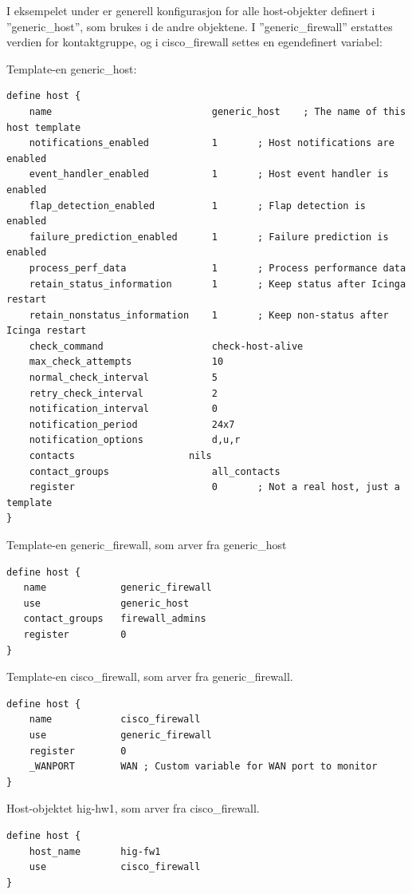 I eksempelet under er generell konfigurasjon for alle host-objekter definert i ''generic\_host'', som brukes i de andre objektene. I ''generic\_firewall'' erstattes verdien for kontaktgruppe, og i cisco\_firewall settes en egendefinert variabel:

Template-en generic\_host: 

\begin{lstlisting}[style=example]
define host {
    name                            generic_host    ; The name of this host template
    notifications_enabled           1       ; Host notifications are enabled
    event_handler_enabled           1       ; Host event handler is enabled
    flap_detection_enabled          1       ; Flap detection is enabled
    failure_prediction_enabled      1       ; Failure prediction is enabled
    process_perf_data               1       ; Process performance data
    retain_status_information       1       ; Keep status after Icinga restart
    retain_nonstatus_information    1       ; Keep non-status after Icinga restart
    check_command                   check-host-alive
    max_check_attempts              10
    normal_check_interval           5
    retry_check_interval            2
    notification_interval           0
    notification_period             24x7
    notification_options            d,u,r
    contacts                	nils
    contact_groups                  all_contacts
    register                        0       ; Not a real host, just a template
}
\end{lstlisting}

Template-en generic\_firewall, som arver fra generic\_host
\begin{lstlisting}[style=example]
define host {
   name             generic_firewall
   use              generic_host
   contact_groups   firewall_admins
   register         0
}
\end{lstlisting}

Template-en cisco\_firewall, som arver fra generic\_firewall.
\begin{lstlisting}[style=example]
define host {
    name            cisco_firewall
    use             generic_firewall
    register        0
    _WANPORT        WAN ; Custom variable for WAN port to monitor
}
\end{lstlisting}

Host-objektet hig-hw1, som arver fra cisco\_firewall.
\begin{lstlisting}[style=example]
define host {
    host_name	    hig-fw1
    use             cisco_firewall
}
\end{lstlisting}

